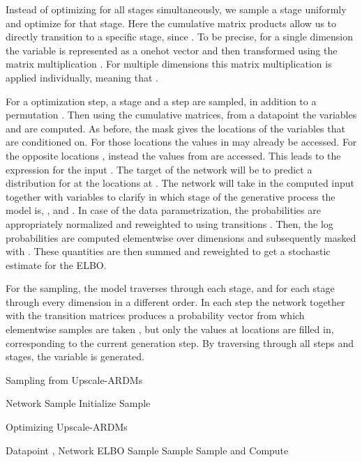 \documentclass{article} \usepackage{iclr2022_conference,times}
\begin{document}
Instead of optimizing for all stages simultaneously, we sample a stage uniformly  and optimize for that stage. Here the cumulative matrix products  allow us to directly transition to a specific stage, since . To be precise, for a single dimension  the variable  is represented as a onehot vector and then transformed using the matrix multiplication . For multiple dimensions this matrix multiplication is applied individually, meaning that .


For a optimization step, a stage  and a step  are sampled, in addition to a permutation . Then using the cumulative matrices, from a datapoint  the variables  and  are computed. As before, the mask  gives the locations of the variables that are conditioned on. For those locations the values in  may already be accessed. For the opposite locations , instead the values from  are accessed. This leads to the expression for the input . The target of the network will be to predict a distribution for  at the locations at . The network will take in the computed input  together with variables to clarify in which stage of the generative process the model is, ,  and . In case of the data parametrization, the probabilities  are appropriately normalized and reweighted to  using transitions . Then, the log probabilities  are computed elementwise over dimensions and subsequently masked with . These quantities are then summed and reweighted to get a stochastic estimate for the ELBO.

For the sampling, the model traverses through each stage, and for each stage through every dimension in a different order. In each step the network together with the transition matrices produces a probability vector  from which elementwise samples are taken , but only the values at locations  are filled in, corresponding to the current generation step. By traversing through all steps and stages, the variable  is generated.
\begin{table}[h]
\begin{minipage}[t]{.47\textwidth}
\begin{algorithm}[H]
   \caption{Sampling from Upscale-ARDMs}
   \label{alg:sample_upscale_ardms}
\begin{algorithmic}
 Network 
    Sample 
\STATE Initialize 
\STATE Sample 
\STATE 
\STATE 
\STATE 
\STATE  
    \STATE { }
    \STATE 
\ENDFOR
\ENDFOR
\end{algorithmic}
\end{algorithm}
\end{minipage}
\hfill
\begin{minipage}[t]{.47\textwidth}
\begin{algorithm}[H]
   \caption{Optimizing Upscale-ARDMs}
   \label{alg:optimize_upscale_ardms}
\begin{algorithmic}
    Datapoint , Network 
    ELBO 
\STATE Sample 
\STATE Sample 
\STATE Sample 
\STATE  and 
\STATE Compute 
\STATE 
\STATE 
\STATE  
\STATE 
\STATE 
\end{algorithmic}
\end{algorithm}
\end{minipage}
\end{table}
\end{document}
